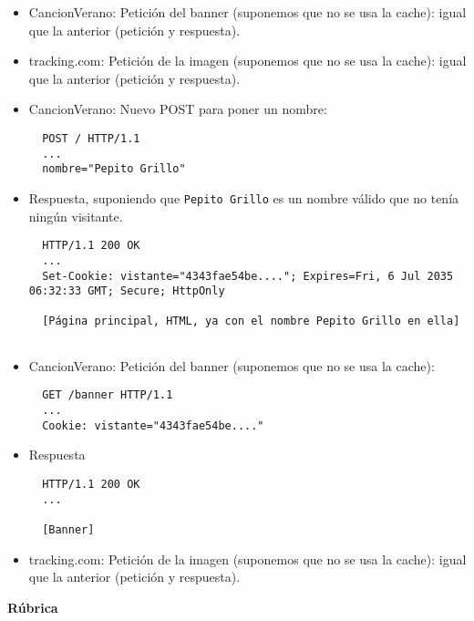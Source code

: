 \begin{itemize}
\begin{verbatim}
  [Página principal, HTML, indicando que el nombre ya existe]
  
\end{verbatim}

\item CancionVerano: Petición del banner (suponemos que no se usa la cache): igual que la anterior (petición y respuesta).

\item tracking.com: Petición de la imagen (suponemos que no se usa la cache): igual que la anterior (petición y respuesta).

\item CancionVerano: Nuevo POST para poner un nombre:

\begin{verbatim}
  POST / HTTP/1.1
  ...
  nombre="Pepito Grillo"
\end{verbatim}

\item Respuesta, suponiendo que \texttt{Pepito Grillo} es un nombre válido que no tenía ningún visitante.

\begin{verbatim}
  HTTP/1.1 200 OK
  ...
  Set-Cookie: vistante="4343fae54be...."; Expires=Fri, 6 Jul 2035 06:32:33 GMT; Secure; HttpOnly

  [Página principal, HTML, ya con el nombre Pepito Grillo en ella]
  
\end{verbatim}
  
\item CancionVerano: Petición del banner  (suponemos que no se usa la cache):

  \begin{verbatim}
  GET /banner HTTP/1.1
  ...
  Cookie: vistante="4343fae54be...."
\end{verbatim}

\item Respuesta

\begin{verbatim}
  HTTP/1.1 200 OK
  ...

  [Banner]
\end{verbatim}

\item tracking.com: Petición de la imagen (suponemos que no se usa la cache): igual que la anterior (petición y respuesta).
\end{itemize}

\vspace{.4cm}\textbf{Rúbrica}

